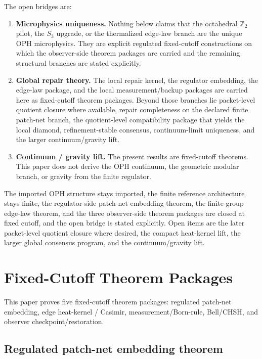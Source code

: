 \documentclass[11pt]{article}
\begin{document}
The open bridges are:
\begin{enumerate}[leftmargin=2em]
\item \textbf{Microphysics uniqueness.}
Nothing below claims that the octahedral $\mathbb Z_2$ pilot, the $S_3$ upgrade, or the
thermalized edge-law branch are the unique OPH microphysics. They are explicit regulated
fixed-cutoff constructions on which the observer-side theorem packages are carried and
the remaining structural branches are stated explicitly.
\item \textbf{Global repair theory.}
The local repair kernel, the regulator embedding, the edge-law package, and the local
measurement/backup packages are carried here as fixed-cutoff theorem packages. Beyond those
branches lie packet-level quotient closure where available,
repair completeness on the declared finite patch-net branch, the quotient-level compatibility
package that yields the local diamond, refinement-stable consensus, continuum-limit uniqueness,
and the larger continuum/gravity lift.
\item \textbf{Continuum / gravity lift.}
The present results are fixed-cutoff theorems. This paper does not derive the OPH
continuum, the geometric modular branch, or gravity from the finite regulator.
\end{enumerate}

The imported OPH structure stays imported, the finite reference architecture stays finite, the
regulator-side patch-net embedding theorem, the finite-group edge-law theorem, and the three
observer-side theorem packages are closed at fixed cutoff, and the open bridge is stated
explicitly. Open items are the later packet-level quotient closure where desired, the
compact heat-kernel lift, the larger global consensus program, and the continuum/gravity lift.

\section{Fixed-Cutoff Theorem Packages}

This paper proves five fixed-cutoff theorem packages: regulated patch-net embedding, edge heat-kernel / Casimir, measurement/Born-rule, Bell/CHSH, and observer checkpoint/restoration.

\subsection{Regulated patch-net embedding theorem}\label{sec:microphysics-feeds-a01}
\end{document}
